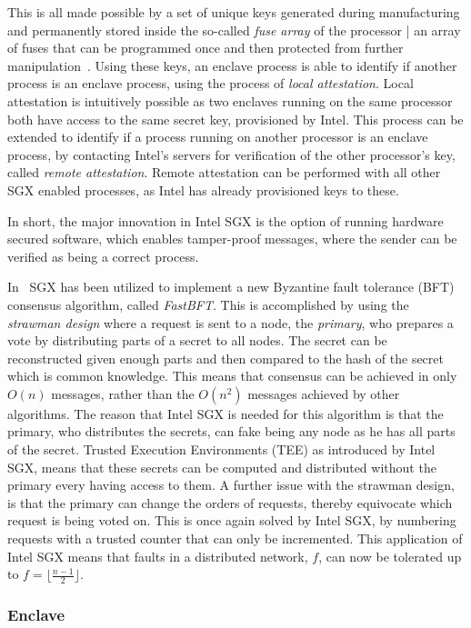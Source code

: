 \documentclass{article}
\begin{document}
		This is all made possible by a set of unique keys generated during manufacturing and permanently stored inside the so-called \textit{fuse array} of the processor | an array of fuses that can be programmed once and then protected from further manipulation~\cite{robson_electrically_2007}.
		Using these keys, an enclave process is able to identify if another process is an enclave process, using the process of \textit{local attestation}.
		Local attestation is intuitively possible as two enclaves running on the same processor both have access to the same secret key, provisioned by Intel.
		This process can be extended to identify if a process running on another processor is an enclave process, by contacting Intel's servers for verification of the other processor's key, called \textit{remote attestation}.
		Remote attestation can be performed with all other SGX enabled processes, as Intel has already provisioned keys to these.

		In short, the major innovation in Intel SGX is the option of running hardware secured software, which enables tamper-proof messages, where the sender can be verified as being a correct process.

		In~\cite{liu_scalable_2016} SGX has been utilized to implement a new Byzantine fault tolerance (BFT) consensus algorithm, called \textit{FastBFT}.
		This is accomplished by using the \textit{strawman design} where a request is sent to a node, the \textit{primary}, who prepares a vote by distributing parts of a secret to all nodes.
		The secret can be reconstructed given enough parts and then compared to the hash of the secret which is common knowledge.
		This means that consensus can be achieved in only $O(n)$ messages, rather than the $O(n^2)$ messages achieved by other algorithms.
		The reason that Intel SGX is needed for this algorithm is that the primary, who distributes the secrets, can fake being any node as he has all parts of the secret.
		Trusted Execution Environments (TEE) as introduced by Intel SGX, means that these secrets can be computed and distributed without the primary every having access to them.
		A further issue with the strawman design, is that the primary can change the orders of requests, thereby equivocate which request is being voted on.
		This is once again solved by Intel SGX, by numbering requests with a trusted counter that can only be incremented.
		This application of Intel SGX means that faults in a distributed network, $f$, can now be tolerated up to $f = \lfloor\frac{n-1}{2}\rfloor$.

			\subsubsection{Enclave}
			\label{subsec:enclave}
\end{document}
